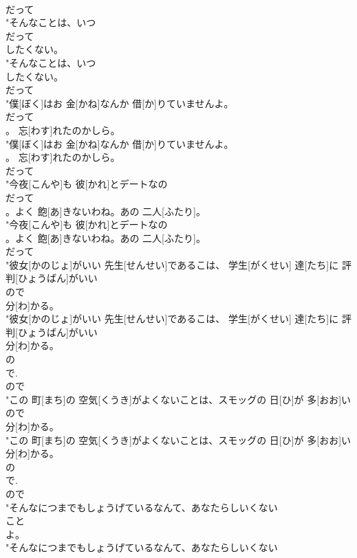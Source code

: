 \documentclass[8pt]{extreport}
\begin{document}
\begin{CJK}{UTF8}{min}
\\	だって
\\	"そんなことは、いつ
\\	だって
\\	したくない。
\\	"そんなことは、いつ
\\	したくない。
\\	だって
\\	"僕[ぼく]はお 金[かね]なんか 借[か]りていませんよ。
\\	だって
\\	。 忘[わす]れたのかしら。
\\	"僕[ぼく]はお 金[かね]なんか 借[か]りていませんよ。
\\	。 忘[わす]れたのかしら。
\\	だって
\\	"今夜[こんや]も 彼[かれ]とデートなの
\\	だって
\\	。よく 飽[あ]きないわね。あの 二人[ふたり]。
\\	"今夜[こんや]も 彼[かれ]とデートなの
\\	。よく 飽[あ]きないわね。あの 二人[ふたり]。
\\	だって
\\	"彼女[かのじょ]がいい 先生[せんせい]であるこは、 学生[がくせい] 達[たち]に 評判[ひょうばん]がいい
\\	ので
\\	分[わ]かる。
\\	"彼女[かのじょ]がいい 先生[せんせい]であるこは、 学生[がくせい] 達[たち]に 評判[ひょうばん]がいい
\\	分[わ]かる。
\\	の 
\\	で.	
\\	ので
\\	"この 町[まち]の 空気[くうき]がよくないことは、スモッグの 日[ひ]が 多[おお]い
\\	ので
\\	分[わ]かる。
\\	"この 町[まち]の 空気[くうき]がよくないことは、スモッグの 日[ひ]が 多[おお]い
\\	分[わ]かる。
\\	の 
\\	で.	
\\	ので
\\	"そんなにつまでもしょうげているなんて、あなたらしいくない
\\	こと
\\	よ。
\\	"そんなにつまでもしょうげているなんて、あなたらしいくない

\end{CJK}
\end{document}

